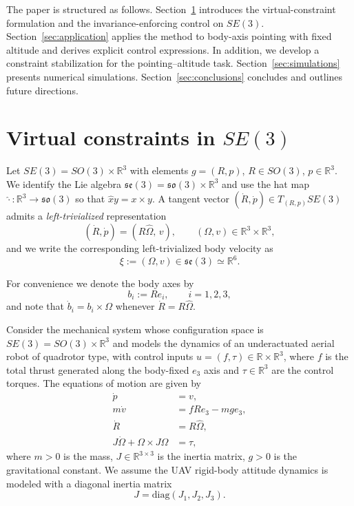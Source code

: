 \documentclass[letterpaper, 10 pt, conference]{ieeeconf}
\newcommand{\R}{\mathbb{R}}
\begin{document}
The paper is structured as follows. Section~\ref{sec:virtual_constraints} introduces the virtual-constraint formulation and the invariance-enforcing control on $SE(3)$. Section~\ref{sec:application} applies the method to body-axis pointing with fixed altitude and derives explicit control expressions. {In addition, we develop a  constraint stabilization for the pointing--altitude task.} Section~\ref{sec:simulations} presents numerical simulations. Section~\ref{sec:conclusions} concludes and outlines future directions.

\section{Virtual constraints in $SE(3)$}\label{sec:virtual_constraints}

Let $SE(3)=SO(3)\times \mathbb{R}^3$ with elements $g=(R,p)$, $R\in SO(3)$, $p\in\mathbb{R}^3$.
We identify the Lie algebra $\mathfrak{se}(3)=\mathfrak{so}(3)\times \mathbb{R}^3$ and use the hat map
$\widehat{\cdot}:\mathbb{R}^3\to\mathfrak{so}(3)$ so that $\widehat{x}y=x\times y$.
A tangent vector $(\dot R,\dot p)\in T_{(R,p)}SE(3)$ admits a \emph{left-trivialized} representation
\begin{equation}\label{eq:left-trivialized-velocity}
(\dot R,\dot p) = (R\widehat{\Omega},\, v),\qquad (\Omega,v)\in\mathbb{R}^3\times\mathbb{R}^3,
\end{equation}
and we write the corresponding left-trivialized body velocity as
\[
\xi := (\Omega,v)\in\mathfrak{se}(3)\simeq \mathbb{R}^6.
\]


For convenience we denote the body axes by
\begin{equation}\label{eq:body-axes}
b_i := R e_i,\qquad i=1,2,3,
\end{equation}
and note that $\dot b_i=b_i\times \Omega$ whenever $\dot R=R\widehat{\Omega}$.


Consider the mechanical system whose configuration space is $SE(3)=SO(3)\times \R^{3}$ and models the dynamics of an underactuated aerial robot of quadrotor type, with control inputs $u = (f,\tau) \in \mathbb{R} \times \mathbb{R}^3$, where $f$ is the total thrust generated along the body-fixed $e_3$ axis and $\tau \in \mathbb{R}^3$ are the control torques. The equations of motion are given by
\begin{align}
\dot{p} &= v, \label{eq:transl_kin}\\
m \dot{v} &= f R e_3 - m g e_3, \label{eq:transl_dyn}\\
\dot{R} &= R \hat{\Omega}, \label{eq:rot_kin}\\
J \dot{\Omega} + \Omega \times J \Omega &= \tau,
\label{eq:rot_dyn}
\end{align}
where $m>0$ is the mass, $J \in \mathbb{R}^{3\times 3}$ is the inertia
matrix, $g>0$ is the gravitational constant. We assume the UAV rigid-body attitude dynamics is modeled with a diagonal inertia matrix
\begin{equation}\label{eq:J-diag}
J=\mathrm{diag}(J_1,J_2,J_3).
\end{equation}
\end{document}
